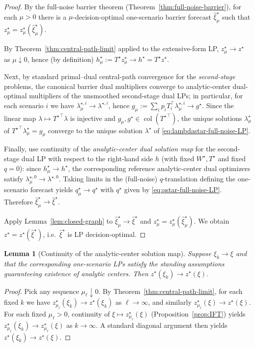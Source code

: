 \documentclass[11pt]{article}
\theoremstyle{plain}
\newtheorem{lemma}[theorem]{Lemma}
\theoremstyle{definition}
\theoremstyle{remark}
\newcommand{\col}{\operatorname{col}}
\begin{document}
\begin{proof}
By the full-noise barrier theorem (Theorem~\ref{thm:full-noise-barrier}), for each $\mu>0$ there is a
$\mu$-decision-optimal one-scenario barrier forecast $\hat\xi_\mu^\star$ such that
$z_\mu^\star=z_\mu^\star(\hat\xi_\mu^\star)$.

By Theorem~\ref{thm:central-path-limit} applied to the extensive-form LP, $z_\mu^\star\to z^\star$ as $\mu\downarrow 0$,
hence (by definition) $h_\mu^\star:=T^\star z_\mu^\star \to h^\star=T^\star z^\star$.

Next, by standard primal--dual central-path convergence for the \emph{second-stage} problems, the canonical barrier dual
multipliers converge to analytic-center dual-optimal multipliers of the unsmoothed second-stage dual LPs; in particular,
for each scenario $i$ we have $\lambda_{\mu}^{\star,i}\to\lambda^{\star,i}$, hence
$g_\mu:=\sum_i p_iT_i^\top\lambda_{\mu}^{\star,i}\to g^\star$.
Since the linear map $\lambda\mapsto {T^\star}^\top\lambda$ is injective and $g_\mu,g^\star\in\col({T^\star}^\top)$,
the unique solutions $\lambda_\mu^\star$ of ${T^\star}^\top\lambda_\mu^\star=g_\mu$ converge to the unique solution
$\lambda^\star$ of \eqref{eq:lambdastar-full-noise-LP}.

Finally, use continuity of the \emph{analytic-center dual solution map} for the second-stage dual LP with respect to the
right-hand side $h$ (with fixed $W^\star,T^\star$ and fixed $q=0$): since $h_\mu^\star\to h^\star$, the corresponding
reference analytic-center dual optimizers satisfy $\lambda_{\mu}^{\star,0}\to\lambda^{\star,0}$. Taking limits in the
(full-noise) $q$-translation defining the one-scenario forecast yields $q_\mu^\star\to q^\star$ with $q^\star$ given by
\eqref{eq:qstar-full-noise-LP}. Therefore $\hat\xi_\mu^\star\to\hat\xi^\star$.

Apply Lemma~\ref{lem:closed-graph} to $\hat\xi_\mu^\star\to\hat\xi^\star$ and $z_\mu^\star=z_\mu^\star(\hat\xi_\mu^\star)$.
We obtain $z^\star=z^\star(\hat\xi^\star)$, i.e.\ $\hat\xi^\star$ is LP decision-optimal.
\end{proof}

\begin{lemma}[Continuity of the analytic-center solution map]\label{lem:ac-continuity}
Suppose $\xi_k\to\xi$ and that the corresponding one-scenario LPs satisfy the standing assumptions guaranteeing
existence of analytic centers. Then $z^\star(\xi_k)\to z^\star(\xi)$.
\end{lemma}

\begin{proof}
Pick any sequence $\mu_\ell\downarrow 0$.
By Theorem~\ref{thm:central-path-limit}, for each fixed $k$ we have $z_{\mu_\ell}^\star(\xi_k)\to z^\star(\xi_k)$ as $\ell\to\infty$,
and similarly $z_{\mu_\ell}^\star(\xi)\to z^\star(\xi)$.
For each fixed $\mu_\ell>0$, continuity of $\xi\mapsto z_{\mu_\ell}^\star(\xi)$ (Proposition~\ref{prop:IFT}) yields
$z_{\mu_\ell}^\star(\xi_k)\to z_{\mu_\ell}^\star(\xi)$ as $k\to\infty$.
A standard diagonal argument then yields $z^\star(\xi_k)\to z^\star(\xi)$.
\end{proof}
\end{document}
